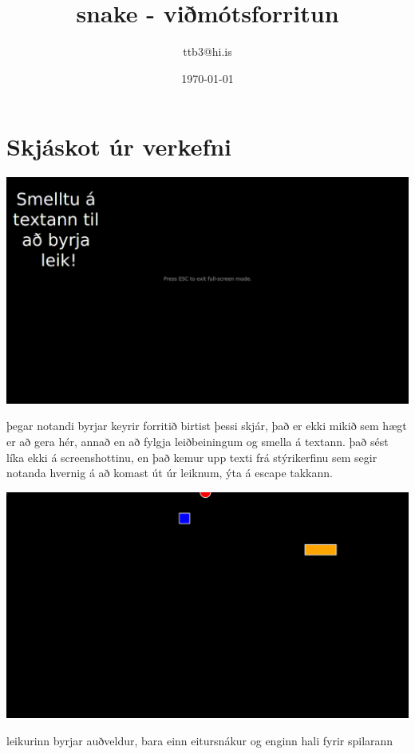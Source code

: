 \documentclass{article}
\title{snake - viðmótsforritun}
\author{ttb3@hi.is}
\date{\today}
\begin{document}
\maketitle


\section*{Skjáskot úr verkefni}
\begin{center}
    \includegraphics[scale=0.175]{sImg1.png}
\end{center}
þegar notandi byrjar keyrir forritið birtist þessi skjár, 
það er ekki mikið sem hægt er að gera hér, 
annað en að fylgja leiðbeiningum og smella á textann.
það sést líka ekki á screenshottinu, 
en það kemur upp texti frá stýrikerfinu sem segir notanda hvernig á að komast út úr leiknum,
ýta á escape takkann.

\begin{center}
    \includegraphics[scale=0.175]{sImg2.png}
\end{center}
leikurinn byrjar auðveldur, bara einn eitursnákur og enginn hali fyrir spilarann
\end{document}
